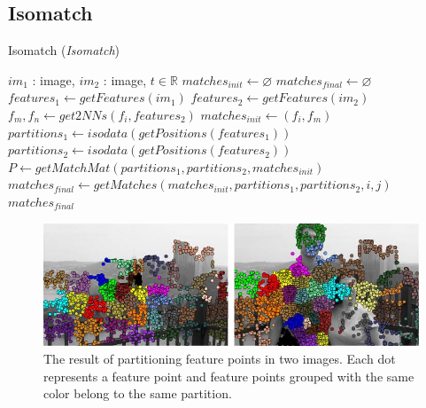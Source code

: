 \subsection{Isomatch}

\begin{algorithm}[h]
\caption{Isomatch (\emph{Isomatch})}
\label{alg-isomatch}
\begin{algorithmic}
\Require $im_1$ : image, $im_2$ : image, $t \in \mathbb{R}$
\State $matches_{init}\gets \varnothing$
\State $matches_{final}\gets \varnothing$
\State $features_1 \gets getFeatures(im_1)$
\State $features_2 \gets getFeatures(im_2)$
    \State $f_m,f_n \gets get2NNs(f_i, features_2)$
    \State $matches_{init} \gets \left(f_i, f_m\right)$
\EndFor
\State $partitions_1 \gets isodata(getPositions(features_1))$
\State $partitions_2 \gets isodata(getPositions(features_2))$
\State $P \gets getMatchMat(partitions_1, partitions_2, matches_{init})$
        \State $matches_{final} \gets getMatches(matches_{init}, 
        partitions_1, partitions_2, i, j)$
    \EndIf
\EndFor
\Return $matches_{final}$
\end{algorithmic}
\end{algorithm}

\begin{figure}[htb]
	\centering
	\includegraphics[width=\columnwidth]{images/isomatch_partitions}
	\caption{The result of partitioning feature points in two images.  
	Each dot represents a feature point and feature points grouped with 
the same color belong to the same partition.}
	\label{fig:isomatch_partitions}
\end{figure}

